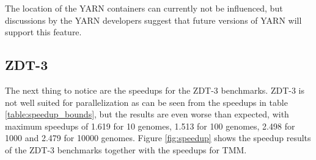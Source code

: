 The location of the YARN containers can currently not be influenced, but discussions by the YARN developers suggest that future versions of YARN will support this feature.

% 

\subsection{ZDT-3}
\label{chap:evaluation:result:zdt3}
The next thing to notice are the speedups for the ZDT-3 benchmarks. ZDT-3 is not well suited for parallelization as can be seen from the speedups in table \ref{table:speedup_bounds}, but the results are even worse than expected, with maximum speedups of 1.619 for 10 genomes, 1.513 for 100 genomes, 2.498 for 1000 and 2.479 for 10000 genomes. Figure \ref{fig:speedup} shows the speedup results of the ZDT-3 benchmarks together with the speedups for TMM.


